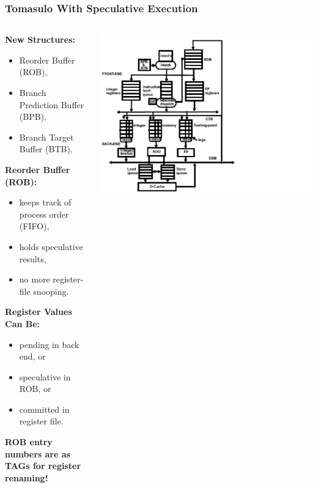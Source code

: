 \documentclass{beamer}
\newcommand{\emp}[1]{\textcolor{DikuRed}{ #1}}
\begin{document}
\begin{frame}[fragile,t]
\frametitle{Tomasulo With Speculative Execution}

\begin{columns}
\begin{scriptsize}
\emp{\bf New Structures:}\smallskip
\begin{itemize}
    \item Reorder Buffer (ROB),
    \item Branch Prediction Buffer (BPB),
    \item Branch Target Buffer (BTB).
\end{itemize}\medskip

\emp{\bf Reorder Buffer (ROB):}
\begin{itemize}
    \item keeps track of process order (FIFO),
    \item holds speculative results,
    \item no more register-file snooping.
\end{itemize}\medskip

\emp{\bf Register Values Can Be:}
\begin{itemize}
    \item pending in back end, or
    \item speculative in ROB, or
    \item committed in register file.
\end{itemize}\medskip

\emp{\bf ROB entry numbers are as TAGs for register renaming!}
\end{scriptsize}
\includegraphics[width=62ex]{FigsOoOProc/TomasuloSpec.pdf}
\end{columns}

\end{frame}
\end{document}
